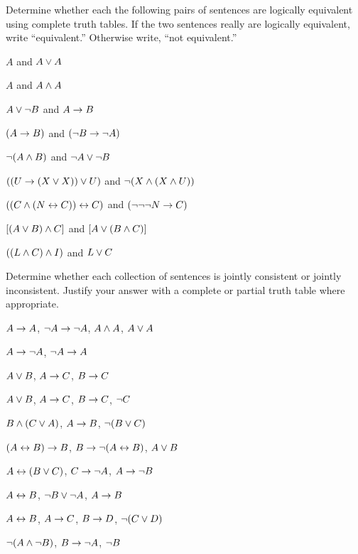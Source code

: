 \noindent\problempart
Determine whether each the following pairs of sentences are logically equivalent using complete truth tables. If the two sentences really are logically equivalent, write ``equivalent.'' Otherwise write, ``not equivalent.''
\begin{earg}
\item $A$ and $A \vee A$
\item $A$ and $A \wedge A$
\item $A \vee \neg B$ and $A\rightarrow B$
\item $(A \rightarrow B)$ and $(\neg B \rightarrow \neg A)$
\item $\neg(A \wedge B)$ and $\neg A \vee \neg B$
\item $ ((U \rightarrow (X \vee X)) \vee U)$ and $\neg (X \wedge (X \wedge U))$
\item $ ((C \wedge (N \leftrightarrow C)) \leftrightarrow C)$ and $(\neg \neg \neg N \rightarrow C)$
\item $[(A \vee B) \wedge C]$ and $[A \vee (B \wedge C)]$
\item $((L \wedge C) \wedge I)$ and $L \vee C$
\end{earg}


\noindent\problempart
\label{pr.TT.consistent5}
Determine whether each collection of sentences is jointly consistent or jointly inconsistent. Justify your answer with a complete or partial truth table where appropriate.
\begin{earg}
\item $A\rightarrow A$, $\neg A \rightarrow \neg A$, $A\wedge A$, $A\vee A$ \vspace{.5ex} \hfill {}
\item $A \rightarrow \neg A$, $\neg A \rightarrow A$\vspace{.5ex} \hfill {}
\item $A\vee B$, $A\rightarrow C$, $B\rightarrow C$\vspace{.5ex} \hfill {}
\item $A \vee B$, $A \rightarrow C$, $B \rightarrow C$, $\neg C$\vspace{.5ex} \hfill {}
\item $B\wedge(C\vee A)$, $A\rightarrow B$, $\neg(B\vee C)$\vspace{.5ex}  \hfill {}
\item $(A \leftrightarrow B) \rightarrow B$,  $B \rightarrow \neg (A \leftrightarrow B)$, $A \vee B$ \vspace{.5ex} \hfill {}
\item $A\leftrightarrow(B\vee C)$, $C\rightarrow \neg A$, $A\rightarrow \neg B$\vspace{.5ex} \hfill {}
\item  $A \leftrightarrow B$,  $\neg B \vee \neg A$,  $A \rightarrow  B$ \vspace{.5ex} \hfill {}
\item $A \leftrightarrow B$, $A \rightarrow C$, $B \rightarrow D$, $\neg(C \vee D)$\vspace{.5ex} \hfill {}
\item $\neg (A \wedge \neg B)$,  $B \rightarrow \neg A$, $\neg B$  \vspace{.5ex} \hfill {}
\end{earg}


